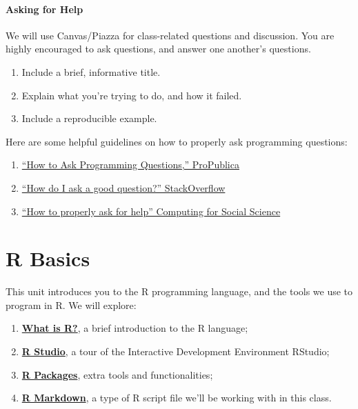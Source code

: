 \documentclass[]{book}
\providecommand{\tightlist}{%
  \setlength{\itemsep}{0pt}\setlength{\parskip}{0pt}}
\begin{document}
\hypertarget{asking-for-help}{%
\subsubsection*{Asking for Help}\label{asking-for-help}}

We will use Canvas/Piazza for class-related questions and discussion. You are highly encouraged to ask questions, and answer one another's questions.

\begin{enumerate}
\def\labelenumi{\arabic{enumi}.}
\tightlist
\item
  Include a brief, informative title.
\item
  Explain what you're trying to do, and how it failed.
\item
  Include a reproducible example.
\end{enumerate}

Here are some helpful guidelines on how to properly ask programming questions:

\begin{enumerate}
\def\labelenumi{\arabic{enumi}.}
\tightlist
\item
  \href{https://www.propublica.org/nerds/how-to-ask-programming-questions}{``How to Ask Programming Questions,'' ProPublica}
\item
  \href{https://stackoverflow.com/help/how-to-ask}{``How do I ask a good question?'' StackOverflow}
\item
  \href{https://cfss.uchicago.edu/faq/asking-questions/}{``How to properly ask for help'' Computing for Social Science}
\end{enumerate}

\hypertarget{r-basics}{%
\chapter{R Basics}\label{r-basics}}

This unit introduces you to the R programming language, and the tools we use to program in R. We will explore:

\begin{enumerate}
\def\labelenumi{\arabic{enumi}.}
\tightlist
\item
  \textbf{\protect\hyperlink{what-is-r}{What is R?}}, a brief introduction to the R language;
\item
  \textbf{\protect\hyperlink{r-studio-1}{R Studio}}, a tour of the Interactive Development Environment RStudio;
\item
  \textbf{\protect\hyperlink{r-packages-1}{R Packages}}, extra tools and functionalities;
\item
  \textbf{\protect\hyperlink{r-markdown}{R Markdown}}, a type of R script file we'll be working with in this class.
\end{enumerate}
\end{document}
